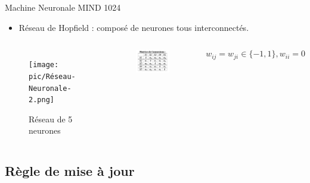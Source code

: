 \documentclass{beamer}
\begin{document}
\begin{frame}{Machine Neuronale MIND 1024}
    \begin{itemize}[<+-| alert@+>] %
        \item Réseau de Hopfield : composé de neurones tous interconnectés.
    \end{itemize}
    \begin{columns}[T]
            \begin{figure}
                \centering
                \texttt{[image: pic/Réseau-Neuronale-2.png]}
                \caption{Réseau de 5 neurones}
            \end{figure}
            \begin{figure}
                \centering
                \includegraphics[width=1.0\linewidth]{pic/Matrice-de-connexions.png}
            \end{figure}
            \[w_{ij} = w_{ji} \in \{-1, 1\}, w_{ii} = 0\]
    \end{columns}
\end{frame}

\subsection{Règle de mise à jour}
\end{document}

